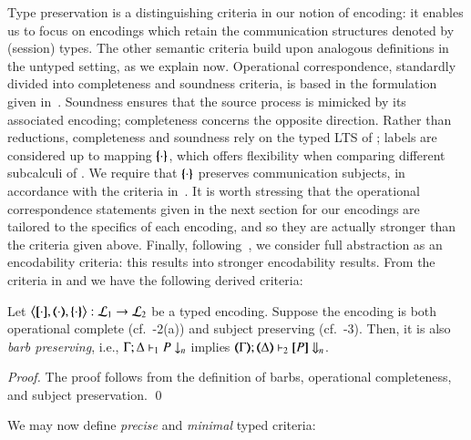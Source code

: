 \noi Type preservation is a distinguishing criteria in our notion of encoding: 
it enables us to focus on encodings which retain the communication structures denoted by (session) types.
The other semantic
criteria build upon analogous definitions in the untyped setting, as we explain now. 
Operational correspondence, standardly divided into completeness and soundness criteria, is based
in the formulation given in~\cite{DBLP:journals/iandc/Gorla10,DBLP:conf/icalp/LanesePSS10}. 
Soundness ensures that the source process is mimicked 
by its associated encoding; completeness concerns the opposite direction.
Rather than reductions, completeness and soundness rely on 
the typed LTS of ; labels are considered up to  mapping
$\{\!\!\{\cdot\}\!\!\}$, which offers flexibility when comparing different subcalculi of \HOp.
We require that $\{\!\!\{\cdot\}\!\!\}$ preserves communication subjects, in accordance with the
criteria in~\cite{DBLP:conf/icalp/LanesePSS10}.
It is worth stressing that 
the operational correspondence statements given in
the next section for our  encodings 
are tailored to the specifics of each encoding, and so they
are actually stronger than the criteria given above.
Finally, following~\cite{SangiorgiD:expmpa,DBLP:conf/lics/PalamidessiSVV06,Yoshida96},
we consider full abstraction as an encodability criteria: this results into 
stronger encodability results. 
From the criteria in  and 
we have the following derived criteria: 

\begin{proposition}\rm
	\label{p:barbpres}
	Let
	$\enco{\map{\cdot}, \mapt{\cdot}, \mapa{\cdot}}: \tyl{L}_1 \to \tyl{L}_2$
	be a typed encoding.
	Suppose the encoding is both
	operational complete (cf.~-2(a)) 
	and subject preserving (cf.~-3).
	Then, it is also \emph{barb preserving}, i.e., 
	$\Gamma; \Delta \vdash_1 P \downarrow_{n}$
	implies
	$\mapt{\Gamma}; \mapt{\Delta} \proves_2 \map{P} \Barb{n}$.
\end{proposition}

\begin{proof}
	The proof follows from the definition of barbs,
	operational completeness, and subject preservation.
	\qed
\end{proof}

We may now define \emph{precise} and \emph{minimal} typed criteria: 

